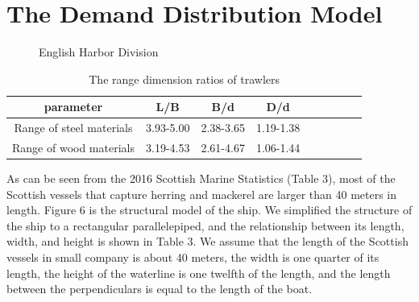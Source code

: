 \documentclass{mcmthesis}
\begin{document}
\section{The Demand Distribution Model}
\begin{figure}[tbp]
  \caption{English Harbor Division}\label{figure1}
\end{figure}

\begin{table}[!htb]
\centering
\setlength{\abovecaptionskip}{0pt}%
\setlength{\belowcaptionskip}{15pt}%
\caption{The range dimension ratios of  trawlers}
\begin{tabular}{ccccccccc}
\toprule[1.5pt]
parameter &L/B&B/d&D/d\\
\toprule[1.5pt]
Range of steel materials&3.93-5.00&2.38-3.65&1.19-1.38\\
Range of wood materials&3.19-4.53&2.61-4.67&1.06-1.44\\
\bottomrule[1.5pt]
\end{tabular}
\end{table}

As can be seen from the 2016 Scottish Marine Statistics (Table 3), most of the Scottish vessels that capture herring and mackerel are larger than 40 meters in length. Figure 6 is the structural model of the ship. We simplified the structure of the ship to a rectangular parallelepiped, and the relationship between its length, width, and height is shown in Table 3. We assume that the length of the Scottish vessels in small company is about 40 meters, the width is one quarter of its length, the height of the waterline is one twelfth of the length, and the length between the  perpendiculars  is equal to the length of the boat.
\end{document}
